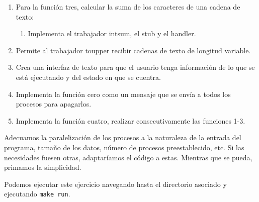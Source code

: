 \begin{enumerate}
\begin{enumerate}
    \end{enumerate}
    \item Para la función tres, calcular la suma de los caracteres de una cadena de texto:
    \begin{enumerate}
        \item Implementa el trabajador intsum, el stub y el handler.
    \end{enumerate}
    \item Permite al trabajador toupper recibir cadenas de texto de longitud variable.
    \item Crea una interfaz de texto para que el usuario tenga información de lo que se está ejecutando y del estado en que se cuentra.
    \item Implementa la función cero como un mensaje que se envía a todos los procesos para apagarlos.
    \item Implementa la función cuatro, realizar consecutivamente las funciones 1-3.
\end{enumerate}

Adecuamos la paralelización de los procesos a la naturaleza de la entrada del programa, tamaño de los datos, número de procesos preestablecido, etc. Si las necesidades fuesen otras, adaptaríamos el código
a estas. Mientras que se pueda, primamos la simplicidad.

Podemos ejecutar este ejercicio navegando hasta el directorio asociado y ejecutando \texttt{make run}.
